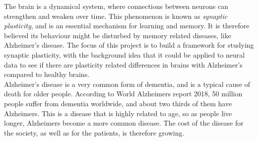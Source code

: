 


The brain is a dynamical system, where connections between neurons can strengthen and weaken over time. This phenomenon is known as \textit{synaptic plasticity}, and is an essential mechanism for learning and memory. It is therefore believed its behaviour might be disturbed by memory related diseases, like Alzheimer's disease. The focus of this project is to build a framework for studying synaptic plasticity, with the background idea that it could be applied to neural data to see if there are plasticity related differences in brains with Alzheimer's compared to healthy brains.  \\

Alzheimer's disease is a very common form of dementia, and is a typical cause of death for older people. According to World Alzheimers report 2018, 50 million people suffer from dementia worldwide, and about two thirds of them have Alzheimers. This is a disease that is highly related to age, so as people live longer, Alzheimers become a more common disease. The cost of the disease for the society, as well as for the patients, is therefore growing.

